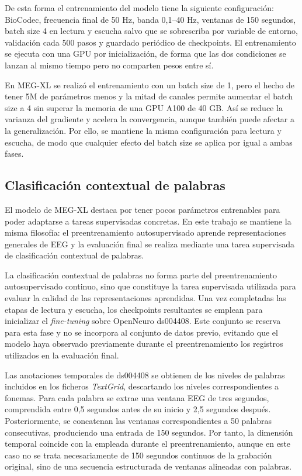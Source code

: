 De esta forma el entrenamiento del modelo tiene la siguiente configuración: BioCodec, frecuencia final de 50 Hz, banda 0,1--40 Hz, ventanas de 150 segundos, batch size 4 en lectura y escucha salvo que se sobrescriba por variable de entorno, validación cada 500 pasos y guardado periódico de checkpoints. El entrenamiento se ejecuta con una GPU por inicialización, de forma que las dos condiciones se lanzan al mismo tiempo pero no comparten pesos entre sí.

En MEG-XL se realizó el entrenamiento con un batch size de 1, pero el hecho de tener 5M de parámetros menos y la mitad de canales permite aumentar el batch size a 4 sin superar la memoria de una GPU A100 de 40 GB. Así se reduce la varianza del gradiente y acelera la convergencia, aunque también puede afectar a la generalización. Por ello, se mantiene la misma configuración para lectura y escucha, de modo que cualquier efecto del batch size se aplica por igual a ambas fases.

\subsection{Clasificación contextual de palabras}

El modelo de MEG-XL destaca por tener pocos parámetros entrenables para poder adaptarse a tareas supervisadas concretas. En este trabajo se mantiene la misma filosofía: el preentrenamiento autosupervisado aprende representaciones generales de EEG y la evaluación final se realiza mediante una tarea supervisada de clasificación contextual de palabras.

La clasificación contextual de palabras no forma parte del preentrenamiento autosupervisado continuo, sino que constituye la tarea supervisada utilizada para evaluar la calidad de las representaciones aprendidas. Una vez completadas las etapas de lectura y escucha, los checkpoints resultantes se emplean para inicializar el \textit{fine-tuning} sobre OpenNeuro ds004408. Este conjunto se reserva para esta fase y no se incorpora al conjunto de datos previo, evitando que el modelo haya observado previamente durante el preentrenamiento los registros utilizados en la evaluación final.

Las anotaciones temporales de ds004408 se obtienen de los niveles de palabras incluidos en los ficheros \textit{TextGrid}, descartando los niveles correspondientes a fonemas. Para cada palabra se extrae una ventana EEG de tres segundos, comprendida entre 0,5 segundos antes de su inicio y 2,5 segundos después. Posteriormente, se concatenan las ventanas correspondientes a 50 palabras consecutivas, produciendo una entrada de 150 segundos. Por tanto, la dimensión temporal coincide con la empleada durante el preentrenamiento, aunque en este caso no se trata necesariamente de 150 segundos continuos de la grabación original, sino de una secuencia estructurada de ventanas alineadas con palabras.

